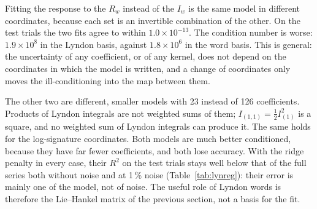\documentclass[11pt,a4paper]{article}
\theoremstyle{remark}
\begin{document}
Fitting the response to the $R_w$ instead of the $I_w$ is the same model in different coordinates, because each set is an invertible combination of the other.
On the test trials the two fits agree to within $1.0\times10^{-13}$.
The condition number is worse: $1.9\times10^{8}$ in the Lyndon basis, against $1.8\times10^{6}$ in the word basis.
This is general: the uncertainty of any coefficient, or of any kernel, does not depend on the coordinates in which the model is written, and a change of coordinates only moves the ill-conditioning into the map between them.

The other two are different, smaller models with 23 instead of 126 coefficients.
Products of Lyndon integrals are not weighted sums of them; $I_{(1,1)}=\tfrac12I_{(1)}^2$ is a square, and no weighted sum of Lyndon integrals can produce it.
The same holds for the log-signature coordinates.
Both models are much better conditioned, because they have far fewer coefficients, and both lose accuracy.
With the ridge penalty in every case, their $R^2$ on the test trials stays well below that of the full series both without noise and at 1\,\% noise (Table~\ref{tab:lynreg}): their error is mainly one of the model, not of noise.
The useful role of Lyndon words is therefore the Lie--Hankel matrix of the previous section, not a basis for the fit.
\end{document}
